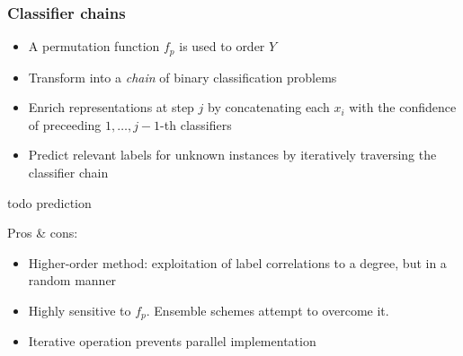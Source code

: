 \documentclass{beamer}
\begin{document}
\begin{frame}
\frametitle{Classifier chains}
\begin{itemize}
\item A permutation function $f_p$ is used to order $Y$
\item Transform into a \emph{chain} of binary classification problems
\item Enrich representations at step $j$ by concatenating each $x_i$ with the confidence of preceeding $1,\dots,j-1$-th classifiers
\item Predict relevant labels for unknown instances by iteratively traversing the classifier chain
\end{itemize}
todo prediction

Pros \& cons:
\begin{itemize}
\item Higher-order method: exploitation of label correlations to a degree, but in a random manner
\item Highly sensitive to $f_p$. Ensemble schemes attempt to overcome it.
\item Iterative operation prevents parallel implementation
\end{itemize}
\end{frame}
\end{document}
